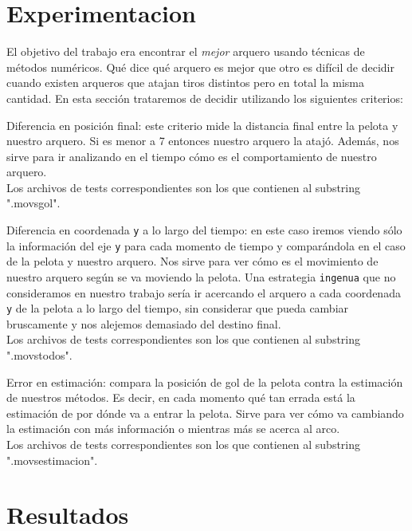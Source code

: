 \section{Experimentacion}
El objetivo del trabajo era encontrar el \textit{mejor} arquero usando técnicas de métodos
numéricos. Qué dice qué arquero es mejor que otro es difícil de decidir cuando existen arqueros que
atajan tiros distintos pero en total la misma cantidad. En esta sección trataremos de decidir
utilizando los siguientes criterios:
\begin{compactitem}
  \item Diferencia en posición final: este criterio mide la distancia final entre la pelota y
    nuestro arquero. Si es menor a 7 entonces nuestro arquero la atajó. Además, nos sirve para ir
    analizando en el tiempo cómo es el comportamiento de nuestro arquero. \\
    Los archivos de tests correspondientes son los que contienen al substring ".movsgol".
  \item Diferencia en coordenada \texttt{y} a lo largo del tiempo: en este caso iremos viendo sólo la
    información del eje \texttt{y} para cada momento de tiempo y comparándola en el caso de la pelota
    y nuestro arquero. Nos sirve para ver cómo es el movimiento de nuestro arquero según se va
    moviendo la pelota. Una estrategia \texttt{ingenua} que no consideramos en nuestro trabajo sería
    ir acercando el arquero a cada coordenada \texttt{y} de la pelota a lo largo del tiempo, sin
    considerar que pueda cambiar bruscamente y nos alejemos demasiado del destino final.
    \\
    Los archivos de tests correspondientes son los que contienen al substring ".movstodos".
  \item Error en estimación: compara la posición de gol de la pelota contra la estimación de
    nuestros métodos. Es decir, en cada momento qué tan errada está la estimación de por dónde va a
    entrar la pelota. Sirve para ver cómo va cambiando la estimación con más información o mientras
    más se acerca al arco.
    \\
    Los archivos de tests correspondientes son los que contienen al substring ".movsestimacion".
  \end{compactitem}


\section{Resultados}

